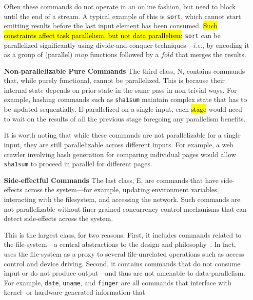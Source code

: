 \documentclass[letterpaper,twocolumn,10pt]{article}
\newcommand{\ie}{{\em i.e.}, }
\newcommand{\heading}[1]{\vspace{4pt}\noindent\textbf{#1}\enspace}
\newcommand{\ttt}[1]{\texttt{#1}}
\newcommand{\cn}[1]{\mbox{\textcircled{\footnotesize #1}}}
\newcommand{\npu}{\cn{\textsc{N}}\xspace}
\newcommand{\sid}{\cn{\textsc{E}}\xspace}
\newcommand{\todo}[1]{\hl{#1}\xspace}
\newcommand{\nv}[1]{[{\color{cyan}nv: #1}]}
\newcommand{\kk}[1]{[{\color{magenta}kk: #1}]}
\begin{document}
Often these commands do not operate in an online fashion, but need to block until the end of a stream.
A typical example of this is \ttt{sort}, which cannot start emitting results before the last input element has been consumed.
\todo{Such constraints affect task parallelism, but not data parallelism}:
  \ttt{sort} can be parallelized significantly using divide-and-conquer techniques---\ie by encoding it as a group of (parallel) $map$ functions followed by a $fold$ that merges the results.


\heading{Non-parallelizable Pure Commands}
The third class, \npu, contains commands that, while purely functional, cannot be parallelized.
This is because their internal state depends on prior state in the same pass in non-trivial ways. %
For example, hashing commands such as \ttt{sha1sum} maintain complex state that has to be updated sequentially.
If parallelized on a single input, each \todo{stage} would need to wait on the results of all the previous stage foregoing any parallelism benefits.

It is worth noting that while these commands are not parallelizable for a single input, they are still parallelizable across different inputs.
For example, a web crawler involving hash generation for comparing individual pages would allow \ttt{sha1sum} to proceed in parallel for different pages.

\heading{Side-effectful Commands}
The last class, \sid, are commands that have side-effects across the system---for example, updating environment variables, interacting with the filesystem, and accessing the network.
Such commands are not parallelizable without finer-grained concurrency control mechanisms that can detect side-effects across the system.

This is the largest class, for two reasons.
First, it includes commands related to the file-system---a central abstractions to the \unix design and philosophy~\cite{unix}.
In fact, \unix uses the file-system as a proxy to several file-unrelated operations such as access control and device driving. %
Second, it contains commands that do not consume input or do not produce output---and thus are not amenable to data-parallelism.
For example, \ttt{date}, \ttt{uname}, and \ttt{finger} are all commands that interface with kernel- or hardware-generated information that
\end{document}
